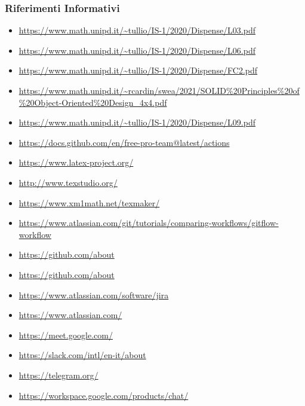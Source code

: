     \subsubsection{Riferimenti Informativi}
        \begin{itemize}
            \item \url{https://www.math.unipd.it/~tullio/IS-1/2020/Dispense/L03.pdf}
            \item \url{https://www.math.unipd.it/~tullio/IS-1/2020/Dispense/L06.pdf}
            \item \url{https://www.math.unipd.it/~tullio/IS-1/2020/Dispense/FC2.pdf}
            \item \url{https://www.math.unipd.it/~rcardin/swea/2021/SOLID\%20Principles\%20of\%20Object-Oriented\%20Design_4x4.pdf}
            \item \url{https://www.math.unipd.it/~tullio/IS-1/2020/Dispense/L09.pdf}
            \item \url{https://docs.github.com/en/free-pro-team@latest/actions}
            \item \url{https://www.latex-project.org/}
            \item \url{http://www.texstudio.org/}
            \item \url{https://www.xm1math.net/texmaker/}
            \item \url{https://www.atlassian.com/git/tutorials/comparing-workflows/gitflow-workflow}
            \item \url{https://github.com/about}
            \item \url{https://github.com/about}
            \item \url{https://www.atlassian.com/software/jira}
            \item \url{https://www.atlassian.com/}
            \item \url{https://meet.google.com/}
            \item \url{https://slack.com/intl/en-it/about}
            \item \url{https://telegram.org/}
            \item \url{https://workspace.google.com/products/chat/}
        \end{itemize}

\pagebreak